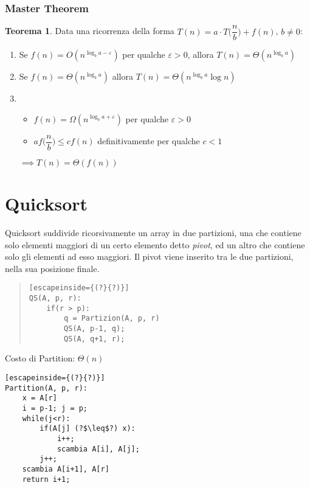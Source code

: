 \documentclass[a4paper,10pt]{article}
\theoremstyle{definition}
\newtheorem{teo}[deff]{Teorema}
\begin{document}
\subsubsection{Master Theorem}
\begin{teo}
    Data una ricorrenza della forma $T(n) = a \cdot T\bigg(\dfrac{n}{b}\bigg) + f(n)$, $b \neq 0$:
    
    \begin{enumerate}
     \item Se $f(n) = O(n^{\log_b a - \varepsilon})$ per qualche $\varepsilon > 0$, allora $T(n) = \Theta(n^{\log_b a})$
     \item Se $f(n) = \Theta(n^{\log_b a})$ allora $T(n) = \Theta(n^{\log_b a} \log n)$
     \item 
     \begin{itemize}
      \item $f(n) = \Omega(n^{\log_b a + \varepsilon})$ per qualche $\varepsilon > 0$
      \item $af\bigg(\dfrac{n}{b}\bigg) \leq cf(n)$ definitivamente per qualche $c<1$
     \end{itemize}
    $\implies T(n) = \Theta(f(n))$
    \end{enumerate}

\end{teo}


\newpage \section{Quicksort}
Quicksort suddivide ricorsivamente un array in due partizioni, una che contiene solo elementi maggiori di un certo elemento detto \emph{pivot}, ed un altro che contiene solo gli elementi ad esso maggiori. Il pivot viene inserito tra le due partizioni, nella sua posizione finale.

\begin{multicols}{2}
\begin{quote}
 
\begin{lstlisting}[escapeinside={(?}{?)}]
QS(A, p, r):
    if(r > p):
        q = Partizion(A, p, r)
        QS(A, p-1, q);
        QS(A, q+1, r);
\end{lstlisting}

\end{quote}

\bigskip
\bigskip
\bigskip
\bigskip
\bigskip
Costo di Partition: $\Theta(n)$

 \begin{lstlisting}[escapeinside={(?}{?)}]
Partition(A, p, r):
    x = A[r]
    i = p-1; j = p;
    while(j<r):
        if(A[j] (?$\leq$?) x):
            i++;
            scambia A[i], A[j];
        j++;
    scambia A[i+1], A[r]
    return i+1;

\end{lstlisting}
\end{multicols}
\end{document}
